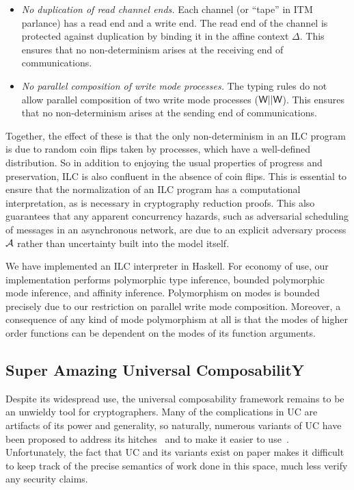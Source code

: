 \begin{itemize}[leftmargin=*]
\item \emph{No duplication of read channel ends.} Each channel (or ``tape'' in
  ITM parlance) has a read end and a write end. The read end of the channel is
  protected against duplication by binding it in the affine context $\Delta$. This
  ensures that no non-determinism arises at the receiving end of communications.

\item \emph{No parallel composition of write mode processes.} The typing rules
  do not allow parallel composition of two write mode processes ($\textsf{W} ||
  \textsf{W}$). This ensures that no non-determinism arises at the sending end of
  communications.
\end{itemize}

Together, the effect of these is that the only non-determinism in an ILC program
is due to random coin flips taken by processes, which have a well-defined
distribution. So in addition to enjoying the usual properties of progress and
preservation, ILC is also confluent in the absence of coin flips. This is
essential to ensure that the normalization of an ILC program has a computational
interpretation, as is necessary in cryptography reduction proofs. 
This also guarantees that any apparent concurrency hazards, such as adversarial
scheduling of messages in an asynchronous network, are due to an explicit
adversary process $\mathcal{{A}}$ rather than uncertainty built into the model itself.

We have implemented an ILC interpreter in Haskell. For economy of use, our
implementation performs polymorphic type inference, bounded polymorphic mode
inference, and  affinity inference. Polymorphism on modes is bounded
precisely due to our restriction on parallel write mode composition. Moreover, a
consequence of any kind of mode polymorphism at all is that the modes of higher
order functions can be dependent on the modes of its function arguments.

\subsection{Super Amazing Universal ComposabilitY}

 Despite its widespread use, the universal
composability framework remains to be an unwieldy tool for cryptographers. Many
of the complications in UC are artifacts of its power and generality, so
naturally, numerous variants of UC have been proposed to address its
hitches~\cite{backes2007reactive, hofheinz2015gnuc, canetti2007universally,
  canetti2003universal} and to make it easier to
use~\cite{canetti2015simpler}. Unfortunately, the fact that UC and its variants
exist on paper makes it difficult to keep track of the precise semantics of work
done in this space, much less verify any security claims.

